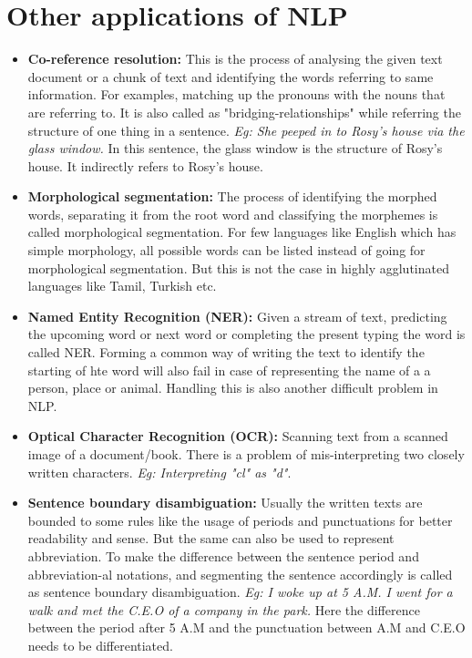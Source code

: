 \documentclass{bmcart}
\begin{document}
\section{Other applications of NLP}
\label{sec:nlpApps}
\begin{itemize}
\item {\bf Co-reference resolution:} This is the process of analysing the given text document or a chunk of text and identifying the words referring to same information. For examples, matching up the pronouns with the nouns that are referring to. It is also called as "bridging-relationships" 
while referring the structure of one thing in a sentence.
\textit{Eg: She peeped in to Rosy's house via the glass window.} In this sentence, the glass window is the structure of Rosy's house. It indirectly refers to Rosy's house. 
\item {\bf Morphological segmentation:} The process of identifying the morphed words, separating it from the root word and classifying the morphemes is called morphological segmentation. For few languages like English which has simple morphology, all possible words can be listed instead of going for morphological segmentation. But this is not the case in highly agglutinated languages like Tamil, Turkish etc. 
\item {\bf Named Entity Recognition (NER):} Given a stream of text, predicting the upcoming word or next word or completing the present typing the word is called NER. Forming a common way of writing the text to identify the starting of hte word will also fail in case of representing the name of a a person, place or animal. Handling this is also another difficult problem in NLP.
\item {\bf Optical Character Recognition (OCR):} Scanning text from a scanned image of a document/book. There is a problem of mis-interpreting two closely written characters. \textit{Eg: Interpreting "cl" as "d"}.
\item \textbf{Sentence boundary disambiguation:} Usually the written texts are bounded to some rules like the usage of periods and punctuations for better readability and sense. But the same can also be used to represent abbreviation. To make the difference between the sentence period and abbreviation-al notations, and segmenting the sentence accordingly is called as sentence boundary disambiguation. 
\textit{Eg: I woke up at 5 A.M. I went for a walk and met the C.E.O of a company in the park.} Here the difference between the period after 5 A.M and the punctuation between A.M and C.E.O needs to be differentiated.
\end{itemize}
\end{document}
